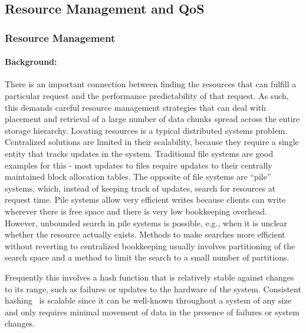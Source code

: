 \subsection{Resource Management and QoS}
\label{sec:qos}

\subsubsection{Resource Management}
\paragraph{Background:} There is an important connection between finding the resources
that can fulfill a particular request and the performance predictability of that request. As such, this demands
careful resource management strategies that can deal with placement and retrieval of 
a large number of data chunks spread across the entire storage hierarchy. 
Locating resources is a typical distributed systems problem. Centralized solutions are limited in their
scalability, because they require a single entity that tracks updates in the system. 
Traditional file systems are good examples for this - most updates to files require updates 
to their centrally maintained block allocation tables. 
The opposite of file systems are ``pile'' systems, which, instead of keeping track of updates, search for 
resources at request time. Pile systems allow very efficient writes because clients can write wherever
there is free space and there is very low bookkeeping overhead. However, unbounded search in pile systems
is possible, e.g., when it is unclear whether the resource actually exists. 
Methods to make searches more efficient without reverting to centralized bookkeeping usually involves 
partitioning of the search space and a method to limit the search to a small number of partitions. 

Frequently this involves a hash function that is relatively stable against changes to its range, 
such as failures or updates to the hardware of the system. Consistent hashing~\cite{karger:stoc97}
is scalable since it can be well-known throughout a system of any size and only requires minimal 
movement of data in the presence of failures or system changes. 

